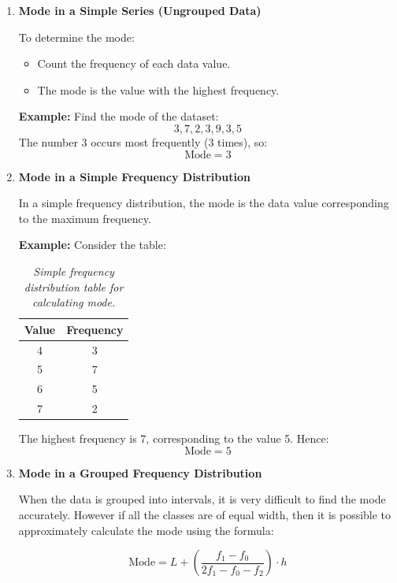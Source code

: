 \documentclass[twoside]{book}
\begin{document}
\begin{enumerate}

\item \textbf{Mode in a Simple Series (Ungrouped Data)}

To determine the mode:
\begin{itemize}
    \item Count the frequency of each data value.
    \item The mode is the value with the highest frequency.
\end{itemize}

\textbf{Example:} Find the mode of the dataset:
\[
3, 7, 2, 3, 9, 3, 5
\]
The number 3 occurs most frequently (3 times), so:
\[
\text{Mode} = 3
\]

\item \textbf{Mode in a Simple Frequency Distribution}

In a simple frequency distribution, the mode is the data value corresponding to the maximum frequency.

\textbf{Example:} Consider the table:

\begin{table}[H]
\begin{center}
	\begin{tabular}{c|c}
		\toprule
		\textbf{Value} & \textbf{Frequency} \\
		\midrule
		4 & 3 \\
		5 & 7 \\
		6 & 5 \\
		7 & 2 \\
		\bottomrule
	\end{tabular}
\end{center}
\caption{\textit{Simple frequency distribution table for calculating mode.}}
\end{table}

The highest frequency is 7, corresponding to the value 5. Hence:
\[
\text{Mode} = 5
\]

\item \textbf{Mode in a Grouped Frequency Distribution}

When the data is grouped into intervals, it is very difficult to find the mode accurately. However if all the classes are of equal width, then it is possible to approximately calculate the mode using the formula:
\begin{textbox}
\[
\text{Mode} = L + \left( \frac{f_1 - f_0}{2f_1 - f_0 - f_2} \right) \cdot h
\]
    \end{textbox}


\end{enumerate}
\end{document}
